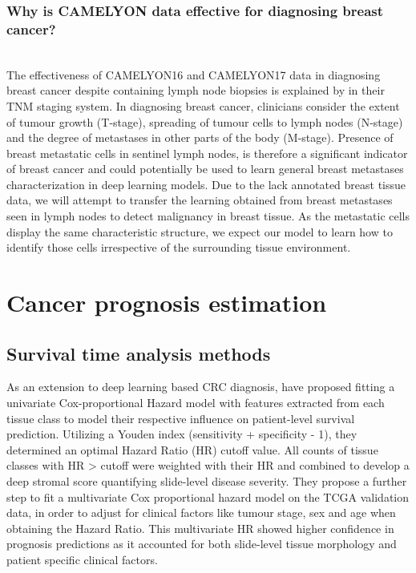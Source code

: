 \documentclass{l4proj}
\begin{document}
\subsubsection{Why is CAMELYON data effective for diagnosing breast cancer?}
\hfill\\
The effectiveness of CAMELYON16 and CAMELYON17 data in diagnosing breast cancer despite containing lymph node biopsies is explained by \cite{sobin2011tnm} in their TNM staging system. In diagnosing breast cancer, clinicians consider the extent of tumour growth (T-stage), spreading of tumour cells to lymph nodes (N-stage) and the degree of metastases in other parts of the body (M-stage). Presence of breast metastatic cells in sentinel lymph nodes, is therefore a significant indicator of breast cancer and could potentially be used to learn general breast metastases characterization in deep learning models. Due to the lack annotated breast tissue data, we will attempt to transfer the learning obtained from breast metastases seen in lymph nodes to detect malignancy in breast tissue. As the metastatic cells display the same characteristic structure, we expect our model to learn how to identify those cells irrespective of the surrounding tissue environment.


\section{Cancer prognosis estimation}
\subsection{Survival time analysis methods} \label{survival-analysis-methods}
As an extension to deep learning based CRC diagnosis, \cite{Kather2019} have proposed fitting a univariate Cox-proportional Hazard model with features extracted from each tissue class to model their respective influence on patient-level survival prediction. Utilizing a Youden index (sensitivity + specificity - 1), they determined an optimal Hazard Ratio (HR) cutoff value. All counts of tissue classes with HR > cutoff were weighted with their HR and combined to develop a deep stromal score quantifying slide-level disease severity. They propose a further step to fit a multivariate Cox proportional hazard model on the TCGA validation data, in order to adjust for clinical factors like tumour stage, sex and age when obtaining the Hazard Ratio. This multivariate HR showed higher confidence in prognosis predictions as it accounted for both slide-level tissue morphology and patient specific clinical factors. 
\end{document}
